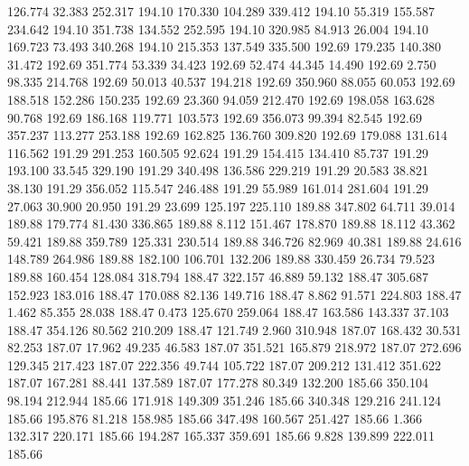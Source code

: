  126.774   32.383  252.317       194.10
 170.330  104.289  339.412       194.10
  55.319  155.587  234.642       194.10
 351.738  134.552  252.595       194.10
 320.985   84.913   26.004       194.10
 169.723   73.493  340.268       194.10
 215.353  137.549  335.500       192.69
 179.235  140.380   31.472       192.69
 351.774   53.339   34.423       192.69
  52.474   44.345   14.490       192.69
   2.750   98.335  214.768       192.69
  50.013   40.537  194.218       192.69
 350.960   88.055   60.053       192.69
 188.518  152.286  150.235       192.69
  23.360   94.059  212.470       192.69
 198.058  163.628   90.768       192.69
 186.168  119.771  103.573       192.69
 356.073   99.394   82.545       192.69
 357.237  113.277  253.188       192.69
 162.825  136.760  309.820       192.69
 179.088  131.614  116.562       191.29
 291.253  160.505   92.624       191.29
 154.415  134.410   85.737       191.29
 193.100   33.545  329.190       191.29
 340.498  136.586  229.219       191.29
  20.583   38.821   38.130       191.29
 356.052  115.547  246.488       191.29
  55.989  161.014  281.604       191.29
  27.063   30.900   20.950       191.29
  23.699  125.197  225.110       189.88
 347.802   64.711   39.014       189.88
 179.774   81.430  336.865       189.88
   8.112  151.467  178.870       189.88
  18.112   43.362   59.421       189.88
 359.789  125.331  230.514       189.88
 346.726   82.969   40.381       189.88
  24.616  148.789  264.986       189.88
 182.100  106.701  132.206       189.88
 330.459   26.734   79.523       189.88
 160.454  128.084  318.794       188.47
 322.157   46.889   59.132       188.47
 305.687  152.923  183.016       188.47
 170.088   82.136  149.716       188.47
   8.862   91.571  224.803       188.47
   1.462   85.355   28.038       188.47
   0.473  125.670  259.064       188.47
 163.586  143.337   37.103       188.47
 354.126   80.562  210.209       188.47
 121.749    2.960  310.948       187.07
 168.432   30.531   82.253       187.07
  17.962   49.235   46.583       187.07
 351.521  165.879  218.972       187.07
 272.696  129.345  217.423       187.07
 222.356   49.744  105.722       187.07
 209.212  131.412  351.622       187.07
 167.281   88.441  137.589       187.07
 177.278   80.349  132.200       185.66
 350.104   98.194  212.944       185.66
 171.918  149.309  351.246       185.66
 340.348  129.216  241.124       185.66
 195.876   81.218  158.985       185.66
 347.498  160.567  251.427       185.66
   1.366  132.317  220.171       185.66
 194.287  165.337  359.691       185.66
   9.828  139.899  222.011       185.66
